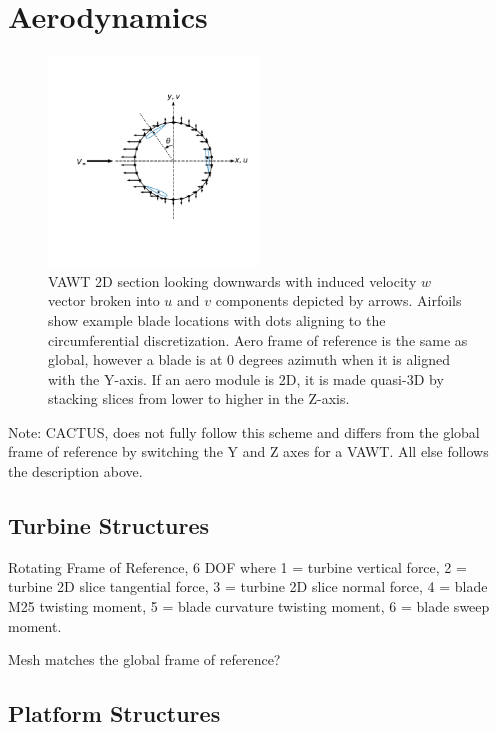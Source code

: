 \documentclass[11pt]{article}
\begin{document}
\section{Aerodynamics}

\begin{figure}[H]
\centering
\vspace{-12pt}
\includegraphics[trim={1.3cm 2.4cm .5cm 1.5cm},clip,width=0.5\textwidth]{../figs/vawt_slice}
\vspace{-12pt}
\caption{VAWT 2D section looking downwards with induced velocity \(w\) vector broken into \(u\) and \(v\) components depicted by arrows. Airfoils show example blade locations with dots aligning to the circumferential discretization.  Aero frame of reference is the same as global, however a blade is at 0 degrees azimuth when it is aligned with the Y-axis.  If an aero module is 2D, it is made quasi-3D by stacking slices from lower to higher in the Z-axis.}
\label{fig:ac_velocities}
\end{figure}

Note: CACTUS, does not fully follow this scheme and differs from the global frame of reference by switching the Y and Z axes for a VAWT.  All else follows the description above.

\subsection{Turbine Structures}

Rotating Frame of Reference, 6 DOF where 1 = turbine vertical force, 2 = turbine 2D slice tangential force, 3 = turbine 2D slice normal force, 4 = blade M25 twisting moment, 5 = blade curvature twisting moment, 6 = blade sweep moment.

Mesh matches the global frame of reference?

\subsection{Platform Structures}
\end{document}
